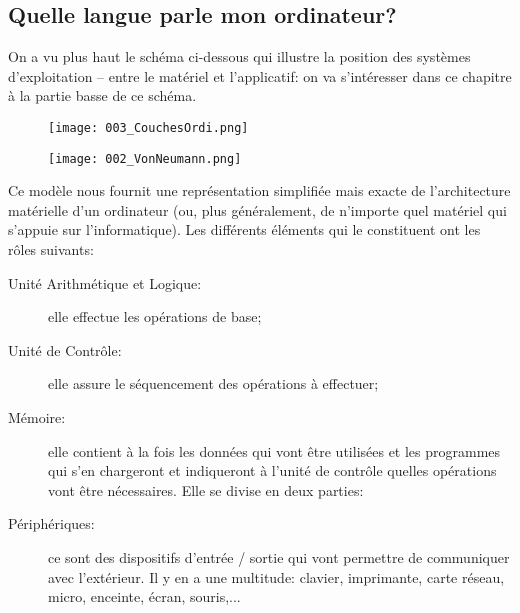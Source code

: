 \documentclass[12pt]{article}
\begin{document}
	 \subsection{Quelle langue parle mon ordinateur?}

	On a vu plus haut le schéma ci-dessous qui illustre la position des systèmes d'exploitation -- entre le matériel et l'applicatif: on va s'intéresser dans ce chapitre à la partie basse de ce schéma.
	
	 \begin{figure}[H]
	 	\centering
	 	\texttt{[image: 003\_CouchesOrdi.png]}
	 \end{figure}
	 

	\begin{MaReponse}	 
	 	
	 	\begin{figure}[H]
	 		\centering
	 		\texttt{[image: 002\_VonNeumann.png]}
	 	\end{figure}
	 	
	 	Ce modèle nous fournit une représentation simplifiée mais exacte de l'architecture matérielle d'un ordinateur (ou, plus généralement, de n'importe quel matériel qui s'appuie sur l'informatique). Les différents éléments qui le constituent ont les rôles suivants:
	 	
	 	\begin{description}
	 		\item[Unité Arithmétique et Logique:] elle effectue les opérations de base;
	 		\item[Unité de Contrôle:] elle assure le séquencement des opérations à effectuer;
	 		\item[Mémoire:] elle contient à la fois les données qui vont être utilisées et les programmes qui s'en chargeront et indiqueront à l'unité de contrôle quelles opérations vont être nécessaires. Elle se divise en deux parties:
	 		
	 		
	 		\item[Périphériques:] ce sont des dispositifs d'entrée / sortie qui vont permettre de communiquer avec l'extérieur. Il y en a une multitude: clavier, imprimante, carte réseau, micro, enceinte, écran, souris,...
	 	\end{description}
	 	
	\end{MaReponse}
	 
\end{document}
